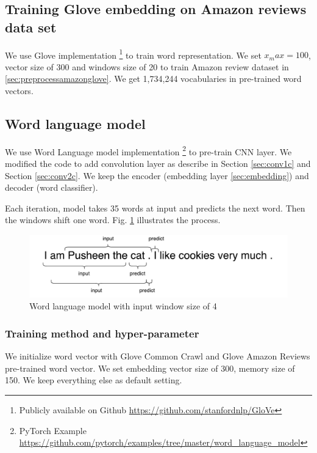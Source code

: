 \subsection{Training Glove embedding on Amazon reviews data set}\label{sec:gloveamazone}

We use Glove implementation \footnote{Publicly available on Github \url{https://github.com/stanfordnlp/GloVe}} to train word representation. We set $x_max = 100$, vector size of 300 and windows size of 20 to train Amazon review dataset in \ref{sec:preprocessamazonglove}. We get 1,734,244 vocabularies in pre-trained word vectors. 

\subsection{Word language model}
We use Word Language model implementation \footnote{PyTorch Example \url{https://github.com/pytorch/examples/tree/master/word_language_model}} to pre-train CNN layer. We modified the code to add convolution layer as describe in Section \ref{sec:conv1c} and Section \ref{sec:conv2c}. We keep the encoder (embedding layer \ref{sec:embedding}) and decoder (word classifier). 

Each iteration, model takes 35 words at input and predicts the next word. Then the windows shift one word. Fig. \ref{fig:wordlanguagemodel} illustrates the process.

\begin{figure}[H]
	\centering
	\includegraphics[width=0.9\linewidth]{figure/wordlanguagemodel}
	\caption[Word language model]{Word language model with input window size of 4}
	\label{fig:wordlanguagemodel}
\end{figure}

\subsubsection{Training method and hyper-parameter}
We initialize word vector with Glove Common Crawl and Glove Amazon Reviews pre-trained word vector. We set embedding vector size of 300, memory size of 150. We keep everything else as default setting.





